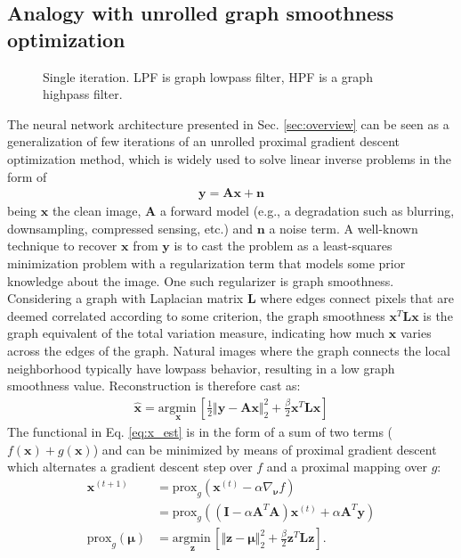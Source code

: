 \documentclass[journal]{IEEEtran}
\newcommand{\nub}{\bm{\nu}}
\newcommand{\mub}{\bm{\mu}}
\newcommand{\Ab}{\mathbf{A}}
\newcommand{\Ib}{\mathbf{I}}
\newcommand{\Lb}{\mathbf{L}}
\newcommand{\nb}{\mathbf{n}}
\newcommand{\xb}{\mathbf{x}}
\newcommand{\yb}{\mathbf{y}}
\newcommand{\zb}{\mathbf{z}}
\newcommand{\argmin}[1]{\underset{#1}{\mathrm{argmin\,}}}
\begin{document}
\subsection{Analogy with unrolled graph smoothness optimization} \label{sec:analogy}

\begin{figure}
    \centering
    \caption{Single iteration. LPF is graph lowpass filter, HPF is a graph highpass filter.}
    \label{fig:update_fig}
\end{figure}

The neural network architecture presented in Sec. \ref{sec:overview} can be seen as a generalization of few iterations of an unrolled proximal gradient descent optimization method, which is widely used to solve linear inverse problems in the form of
\begin{align}\label{eq:noise_model}
    \yb = \Ab\xb + \nb
\end{align}
being $\xb$ the clean image, $\Ab$ a forward model (e.g., a degradation such as blurring, downsampling, compressed sensing, etc.) and $\nb$ a noise term. A well-known technique to recover $\xb$ from $\yb$ is to cast the problem as a least-squares minimization problem with a regularization term that models some prior knowledge about the image. One such regularizer is graph smoothness. Considering a graph with Laplacian matrix $\Lb$ where edges connect pixels that are deemed correlated according to some criterion, the graph smoothness $\xb^T \Lb \xb$ is the graph equivalent of the total variation measure, indicating how much $\xb$ varies across the edges of the graph. Natural images where the graph connects the local neighborhood typically have lowpass behavior, resulting in a low graph smoothness value. Reconstruction is therefore cast as:
\begin{align} \label{eq:x_est}
    \hat{\xb} = \argmin{\xb} \left[ \frac{1}{2}\Vert \yb - \Ab\xb \Vert^2_2 + \frac{\beta}{2} \xb^T \Lb \xb \right]
\end{align}
The functional in Eq. \eqref{eq:x_est} is in the form of a sum of two terms ($f(\xb) + g(\xb)$) and can be minimized by means of proximal gradient descent \cite{combettes2011proximal} which alternates a gradient descent step over $f$ and a proximal mapping over $g$:
\begin{align*}
    \xb^{(t+1)} &= \text{prox}_g \left( \xb^{(t)} - \alpha \nabla_{\nub}f  \right) \\ &= \text{prox}_g \left( (\Ib-\alpha\Ab^T\Ab)\xb^{(t)} + \alpha \Ab^T\yb \right) \\
    \text{prox}_g \left( \mub \right) &= \argmin{\zb} \left[ \Vert \zb - \mub \Vert^2_2 + \frac{\beta}{2} \zb^T \Lb \zb \right].
\end{align*}
\end{document}
